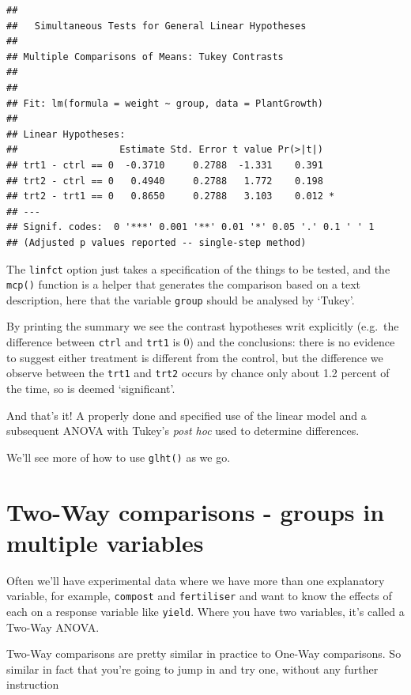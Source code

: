 \documentclass[
]{book}
\begin{document}
\begin{verbatim}
## 
## 	 Simultaneous Tests for General Linear Hypotheses
## 
## Multiple Comparisons of Means: Tukey Contrasts
## 
## 
## Fit: lm(formula = weight ~ group, data = PlantGrowth)
## 
## Linear Hypotheses:
##                  Estimate Std. Error t value Pr(>|t|)  
## trt1 - ctrl == 0  -0.3710     0.2788  -1.331    0.391  
## trt2 - ctrl == 0   0.4940     0.2788   1.772    0.198  
## trt2 - trt1 == 0   0.8650     0.2788   3.103    0.012 *
## ---
## Signif. codes:  0 '***' 0.001 '**' 0.01 '*' 0.05 '.' 0.1 ' ' 1
## (Adjusted p values reported -- single-step method)
\end{verbatim}

The \texttt{linfct} option just takes a specification of the things to be tested, and the \texttt{mcp()} function is a helper that generates the comparison based on a text description, here that the variable \texttt{group} should be analysed by `Tukey'.

By printing the summary we see the contrast hypotheses writ explicitly (e.g.~the difference between \texttt{ctrl} and \texttt{trt1} is 0) and the conclusions: there is no evidence to suggest either treatment is different from the control, but the difference we observe between the \texttt{trt1} and \texttt{trt2} occurs by chance only about 1.2 percent of the time, so is deemed `significant'.

And that's it! A properly done and specified use of the linear model and a subsequent ANOVA with Tukey's \emph{post hoc} used to determine differences.

We'll see more of how to use \texttt{glht()} as we go.

\hypertarget{two-way-comparisons---groups-in-multiple-variables}{%
\section{Two-Way comparisons - groups in multiple variables}\label{two-way-comparisons---groups-in-multiple-variables}}

Often we'll have experimental data where we have more than one explanatory variable, for example, \texttt{compost} and \texttt{fertiliser} and want to know the effects of each on a response variable like \texttt{yield}. Where you have two variables, it's called a Two-Way ANOVA.

Two-Way comparisons are pretty similar in practice to One-Way comparisons. So similar in fact that you're going to jump in and try one, without any further instruction
\end{document}
